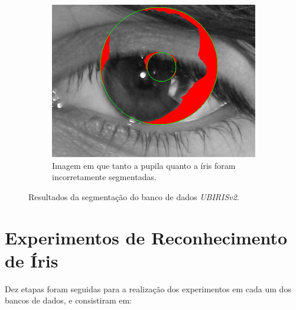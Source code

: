 \begin{figure}[h!]
\begin{subfigure}{.25\textwidth}
\includegraphics[width=\linewidth]{img/Resultados/ubirisv2/ubirisv2_seg_ruim2.jpg}
\caption{Imagem em que tanto a pupila quanto a íris foram incorretamente segmentadas.}
\end{subfigure}
\caption{Resultados da segmentação do banco de dados \textit{UBIRISv2}.}
\label{fig:experimentos:miche_boas}
\end{figure}

\FloatBarrier

\section{Experimentos de Reconhecimento de Íris}\label{sec:experimentos:experimentos}

\par Dez etapas foram seguidas para a realização dos experimentos em cada um dos bancos de dados, e consistiram em:

